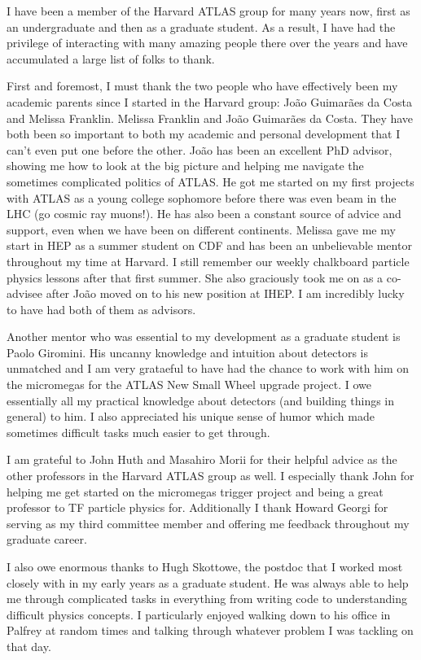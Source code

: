 
I have been a member of the Harvard ATLAS group for many years now, first as an undergraduate and then as a graduate student. As a result, I have had the privilege of interacting with many amazing people there over the years and have accumulated a large list of folks to thank. 

First and foremost, I must thank the two people who have effectively been my academic parents since I started in the Harvard group: Jo\~{a}o Guimar\~{a}es da Costa and Melissa Franklin. Melissa Franklin and Jo\~{a}o Guimar\~{a}es da Costa. They have both been so important to both my academic and personal development that I can't even put one before the other. Jo\~{a}o has been an excellent PhD advisor, showing me how to look at the big picture and helping me navigate the sometimes complicated politics of ATLAS. He got me started on my first projects with ATLAS as a young college sophomore before there was even beam in the LHC (go cosmic ray muons!). He has also been a constant source of advice and support, even when we have been on different continents. Melissa gave me my start in HEP as a summer student on CDF and has been an unbelievable mentor throughout my time at Harvard. I still remember our weekly chalkboard particle physics lessons after that first summer. She also graciously took me on as a co-advisee after Jo\~{a}o moved on to his new position at IHEP. I am incredibly lucky to have had both of them as advisors. 

Another mentor who was essential to my development as a graduate student is Paolo Giromini. His uncanny knowledge and intuition about detectors is unmatched and I am very grataeful to have had the chance to work with him on the micromegas for the ATLAS New Small Wheel upgrade project. I owe essentially all my practical knowledge about detectors (and building things in general) to him. I also appreciated his unique sense of humor which made sometimes difficult tasks much easier to get through.

I am grateful to John Huth and Masahiro Morii for their helpful advice as the other professors in the Harvard ATLAS group as well. I especially thank John for helping me get started on the micromegas trigger project and being a great professor to TF particle physics for. Additionally I thank Howard Georgi for serving as my third committee member and offering me feedback throughout my graduate career. 

I also owe enormous thanks to Hugh Skottowe, the postdoc that I worked most closely with in my early years as a graduate student. He was always able to help me through complicated tasks in everything from writing code to understanding difficult physics concepts. I particularly enjoyed walking down to his office in Palfrey at random times and talking through whatever problem I was tackling on that day. 

